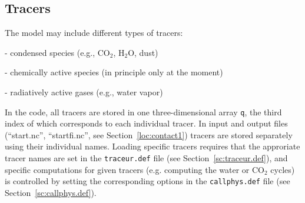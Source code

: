 \subsection{Tracers}
The model may include different types of tracers:
\begin{description}
\item - condensed species (e.g., CO$_2$, H$_2$O, dust)
\item - chemically active species (in principle only at the moment)
\item - radiatively active gases (e.g., water vapor)
\end{description}

In the code, all tracers are stored in one three-dimensional array {\tt q},
the third index of which corresponds to each individual tracer.
In input and output files (``start.nc'', ``startfi.nc'',
see Section~\ref{loc:contact1}) tracers are stored separately using their
individual names. Loading specific tracers requires that
the approriate tracer names are set in the {\tt traceur.def} file
(see Section~\ref{sc:traceur.def}), and specific computations
for given tracers (e.g. computing the water or CO$_2$ cycles) 
is controlled by setting the corresponding options in the
{\tt callphys.def} file (see Section~\ref{sc:callphys.def}).


